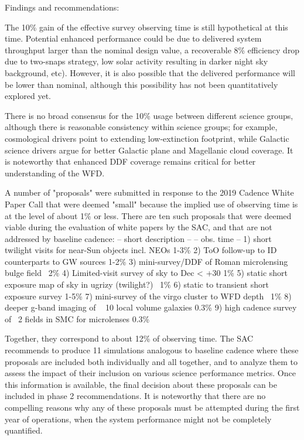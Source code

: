Findings and recommendations:
 
The 10\% gain of the effective survey observing time is still hypothetical at this time. Potential
enhanced performance could be due to delivered system throughput larger than the nominal 
design value, a recoverable 8\% efficiency drop due to two-snaps strategy, low solar activity
resulting in darker night sky background, etc). However, it is also possible that the delivered 
performance will be lower than nominal, although this possibility has not been quantitatively 
explored yet.

There is no broad consensus for the 10\% usage between different science groups, although 
there is reasonable consistency within science groups; for example, cosmological drivers point to extending low-extinction footprint, while Galactic science drivers argue for better Galactic plane and Magellanic cloud coverage. It is noteworthy that enhanced DDF coverage remains critical for better understanding of the WFD.

A number of "proposals" were submitted in response to the 2019 Cadence White Paper Call 
that were deemed "small" because the implied use of observing time is at the level of about 
1\% or less. There are ten such proposals that were deemed viable during the 
evaluation of white papers by the SAC, and that are not addressed by baseline cadence:
             -- short description --                                       -- obs. time --
1) short twilight visits for near-Sun objects incl. NEOs         1-3\%
2) ToO follow-up to ID counterparts to GW sources             1-2\% 
3) mini-survey/DDF of Roman microlensing bulge field         ~2\%
4) Limited-visit survey of sky to Dec < +30                              1\%
5) static short exposure map of sky in ugrizy (twilight?)        ~1\%
6) static to transient short exposure survey                          1-5\%
7) mini-survey of the virgo cluster to WFD depth                   ~1\%
8) deeper g-band imaging of ~ 10 local volume galaxies      0.3\%
9) high cadence survey of ~2 fields in SMC for microlenses 0.3\%
  
Together, they correspond to about 12\% of observing time. The SAC recommends to produce 11 simulations analogous to baseline cadence where these proposals are included both individually and all together, and to analyze them to assess the impact of their inclusion on various science performance metrics. Once this information is available, the final decision 
about these proposals can be included in phase 2 recommendations. It is noteworthy that 
there are no compelling reasons why any of these proposals must be attempted during the 
first year of operations, when the system performance might not be completely quantified. 


